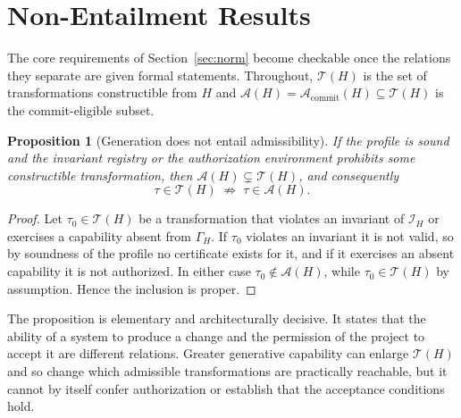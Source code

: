 \documentclass[11pt]{article}
\newtheorem{proposition}{Proposition}
\theoremstyle{remark}
\newcommand{\Tt}{\mathcal{T}}
\begin{document}
\section{Non-Entailment Results}\label{sec:results}

The core requirements of Section~\ref{sec:norm} become checkable once the relations they separate are given formal statements. Throughout, $\Tt(H)$ is the set of transformations constructible from $H$ and $\mathcal A(H)=\mathcal A_{\mathrm{commit}}(H)\subseteq\Tt(H)$ is the commit-eligible subset.

\begin{proposition}[Generation does not entail admissibility]
If the profile is sound and the invariant registry or the authorization environment prohibits some constructible transformation, then $\mathcal A(H)\subsetneq\Tt(H)$, and consequently
\[
\tau\in\Tt(H)\;\not\Longrightarrow\;\tau\in\mathcal A(H).
\]
\end{proposition}
\begin{proof}
Let $\tau_0\in\Tt(H)$ be a transformation that violates an invariant of $\mathcal I_H$ or exercises a capability absent from $\Gamma_H$. If $\tau_0$ violates an invariant it is not valid, so by soundness of the profile no certificate exists for it, and if it exercises an absent capability it is not authorized. In either case $\tau_0\notin\mathcal A(H)$, while $\tau_0\in\Tt(H)$ by assumption. Hence the inclusion is proper.
\end{proof}

The proposition is elementary and architecturally decisive. It states that the ability of a system to produce a change and the permission of the project to accept it are different relations. Greater generative capability can enlarge $\Tt(H)$ and so change which admissible transformations are practically reachable, but it cannot by itself confer authorization or establish that the acceptance conditions hold.
\end{document}
